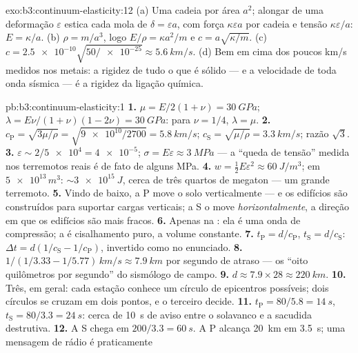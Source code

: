 \begin{solution}{exo:b3:continuum-elasticity:12}
(a) Uma cadeia por área $a^2$; alongar de uma deformação $\varepsilon$
estica cada mola de $\delta = \varepsilon a$, com força $\kappa
\varepsilon a$ por cadeia e tensão $\kappa\varepsilon/a$: $E =
\kappa/a$. (b) $\rho = m/a^3$, logo $E/\rho = \kappa a^2/m$ e $c =
a\sqrt{\kappa/m}$. (c) $c = \num{2.5e-10}\sqrt{50/\num{e-25}} \approx
\qty{5.6}{km/s}$. (d) Bem em cima dos poucos km/s medidos nos metais: a
rigidez de tudo o que é sólido --- e a velocidade de toda onda sísmica
--- é a rigidez da ligação química.
\end{solution}

\begin{solution}{pb:b3:continuum-elasticity:1}
\textbf{1.} $\mu = E/2(1+\nu) = \qty{30}{GPa}$; $\lambda =
E\nu/(1+\nu)(1-2\nu) = \qty{30}{GPa}$: para $\nu = 1/4$, $\lambda =
\mu$.
\textbf{2.} $c_{\text{P}} = \sqrt{3\mu/\rho} = \sqrt{\num{9e10}/2700}
= \qty{5.8}{km/s}$; $c_{\text{S}} = \sqrt{\mu/\rho} =
\qty{3.3}{km/s}$; razão $\sqrt3$.
\textbf{3.} $\varepsilon \sim 2/\num{5e4} = \num{4e-5}$; $\sigma =
E\varepsilon \approx \qty{3}{MPa}$ --- a ``queda de tensão'' medida
nos terremotos reais é de fato de alguns MPa.
\textbf{4.} $w = \tfrac12 E\varepsilon^2 \approx \qty{60}{J/m^3}$; em
$\num{5e13}{}\,\unit{m^3}$: $\sim\qty{3e15}{J}$, cerca de
três quartos de megaton --- um grande terremoto.
\textbf{5.} Vindo de baixo, a P move o solo verticalmente --- e os
edifícios são construídos para suportar cargas verticais; a S o move
\emph{horizontalmente}, a direção em que os edifícios são mais fracos.
\textbf{6.} Apenas na : ela é uma onda de compressão; a  é
cisalhamento puro, a volume constante.
\textbf{7.} $t_{\text{P}} = d/c_{\text{P}}$, $t_{\text{S}} =
d/c_{\text{S}}$: $\Delta t = d(1/c_{\text{S}} - 1/c_{\text{P}})$,
invertido como no enunciado.
\textbf{8.} $1/(1/3.33 - 1/5.77)\,\unit{km/s} \approx
\qty{7.9}{km}$ por segundo de atraso --- os ``oito quilômetros por
segundo'' do sismólogo de campo.
\textbf{9.} $d \approx 7.9 \times 28 \approx \qty{220}{km}$.
\textbf{10.} Três, em geral: cada estação conhece um círculo de
epicentros possíveis; dois círculos se cruzam em dois pontos, e o
terceiro decide.
\textbf{11.} $t_{\text{P}} = 80/5.8 = \qty{14}{s}$, $t_{\text{S}} =
80/3.3 = \qty{24}{s}$: cerca de \qty{10}{s} de aviso entre o solavanco
e a sacudida destrutiva.
\textbf{12.} A S chega em $200/3.3 = \qty{60}{s}$. A P alcança
\qty{20}{km} em \qty{3.5}{s}; uma mensagem de rádio é praticamente

\end{solution}
